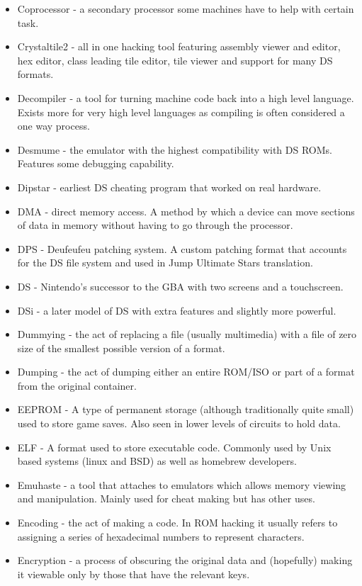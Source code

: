 \documentclass[
]{book}
\begin{document}
\begin{itemize}
\item
  Coprocessor - a secondary processor some machines have to help with certain task.
\item
  Crystaltile2 - all in one hacking tool featuring assembly viewer and editor, hex editor, class leading tile editor, tile viewer and support for many DS formats.
\item
  Decompiler - a tool for turning machine code back into a high level language. Exists more for very high level languages as compiling is often considered a one way process.
\item
  Desmume - the emulator with the highest compatibility with DS ROMs. Features some debugging capability.
\item
  Dipstar - earliest DS cheating program that worked on real hardware.
\item
  DMA - direct memory access. A method by which a device can move sections of data in memory without having to go through the processor.
\item
  DPS - Deufeufeu patching system. A custom patching format that accounts for the DS file system and used in Jump Ultimate Stars translation.
\item
  DS - Nintendo's successor to the GBA with two screens and a touchscreen.
\item
  DSi - a later model of DS with extra features and slightly more powerful.
\item
  Dummying - the act of replacing a file (usually multimedia) with a file of zero size of the smallest possible version of a format.
\item
  Dumping - the act of dumping either an entire ROM/ISO or part of a format from the original container.
\item
  EEPROM - A type of permanent storage (although traditionally quite small) used to store game saves. Also seen in lower levels of circuits to hold data.
\item
  ELF - A format used to store executable code. Commonly used by Unix based systems (linux and BSD) as well as homebrew developers.
\item
  Emuhaste - a tool that attaches to emulators which allows memory viewing and manipulation. Mainly used for cheat making but has other uses.
\item
  Encoding - the act of making a code. In ROM hacking it usually refers to assigning a series of hexadecimal numbers to represent characters.
\item
  Encryption - a process of obscuring the original data and (hopefully) making it viewable only by those that have the relevant keys.

\end{itemize}
\end{document}
